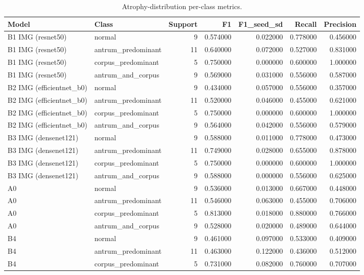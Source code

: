 \begin{table}
\caption{Atrophy-distribution per-class metrics.}
\label{tab:table4_distribution_per_class}
\begin{tabular}{llrrrrr}
\toprule
Model & Class & Support & F1 & F1\_seed\_sd & Recall & Precision \\
\midrule
B1 IMG (resnet50) & normal & 9 & 0.574000 & 0.022000 & 0.778000 & 0.456000 \\
B1 IMG (resnet50) & antrum\_predominant & 11 & 0.640000 & 0.072000 & 0.527000 & 0.831000 \\
B1 IMG (resnet50) & corpus\_predominant & 5 & 0.750000 & 0.000000 & 0.600000 & 1.000000 \\
B1 IMG (resnet50) & antrum\_and\_corpus & 9 & 0.569000 & 0.031000 & 0.556000 & 0.587000 \\
B2 IMG (efficientnet\_b0) & normal & 9 & 0.434000 & 0.057000 & 0.556000 & 0.357000 \\
B2 IMG (efficientnet\_b0) & antrum\_predominant & 11 & 0.520000 & 0.046000 & 0.455000 & 0.621000 \\
B2 IMG (efficientnet\_b0) & corpus\_predominant & 5 & 0.750000 & 0.000000 & 0.600000 & 1.000000 \\
B2 IMG (efficientnet\_b0) & antrum\_and\_corpus & 9 & 0.564000 & 0.042000 & 0.556000 & 0.579000 \\
B3 IMG (densenet121) & normal & 9 & 0.588000 & 0.011000 & 0.778000 & 0.473000 \\
B3 IMG (densenet121) & antrum\_predominant & 11 & 0.749000 & 0.028000 & 0.655000 & 0.878000 \\
B3 IMG (densenet121) & corpus\_predominant & 5 & 0.750000 & 0.000000 & 0.600000 & 1.000000 \\
B3 IMG (densenet121) & antrum\_and\_corpus & 9 & 0.588000 & 0.000000 & 0.556000 & 0.625000 \\
A0 & normal & 9 & 0.536000 & 0.013000 & 0.667000 & 0.448000 \\
A0 & antrum\_predominant & 11 & 0.546000 & 0.063000 & 0.455000 & 0.706000 \\
A0 & corpus\_predominant & 5 & 0.813000 & 0.018000 & 0.880000 & 0.766000 \\
A0 & antrum\_and\_corpus & 9 & 0.528000 & 0.020000 & 0.489000 & 0.644000 \\
B4 & normal & 9 & 0.461000 & 0.097000 & 0.533000 & 0.409000 \\
B4 & antrum\_predominant & 11 & 0.463000 & 0.122000 & 0.436000 & 0.512000 \\
B4 & corpus\_predominant & 5 & 0.731000 & 0.082000 & 0.760000 & 0.707000 \\

\end{tabular}
\end{table}
